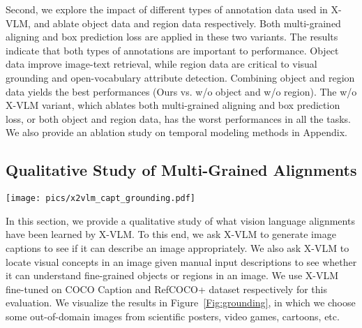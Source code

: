 \documentclass{article}
\newcommand{\baby}{X-VLM\xspace}
\newcommand{\babyL}{X-VLM\xspace}
\begin{document}
Second, we explore the impact of different types of annotation data used in \baby, and ablate object data and region data respectively. Both multi-grained aligning and box prediction loss are applied in these two variants. The results indicate that both types of annotations are important to performance. Object data improve image-text retrieval, while region data are critical to visual grounding and open-vocabulary attribute detection. Combining object and region data yields the best performances (Ours vs. w/o object and w/o region). The w/o \baby variant, which ablates both multi-grained aligning and box prediction loss, or both object and region data, has the worst performances in all the tasks. We also provide an ablation study on temporal modeling methods in Appendix. 





\subsection{Qualitative Study of Multi-Grained Alignments}

\begin{figure*}[t]
\begin{center}
\centerline{\texttt{[image: pics/x2vlm\_capt\_grounding.pdf]}}
\caption{\textbf{Visualization of \baby generating image captions and locating visual concepts given manual input texts.} Only the image in the upper left corner is from the COCO dataset. Others are out-of-domain images from the internet. We give more examples in Appendix where we test \baby on images from robot grasping, e-commerce websites, and children's textbooks. }
\label{Fig:grounding}
\end{center}
\end{figure*}

In this section, we provide a qualitative study of what vision language alignments have been learned by \baby. To this end, we ask \baby to generate image captions to see if it can describe an image appropriately. We also ask \baby to locate visual concepts in an image given manual input descriptions to see whether it can understand fine-grained objects or regions in an image. We use \babyL fine-tuned on COCO Caption and RefCOCO+ dataset respectively for this evaluation. We visualize the results in Figure~\ref{Fig:grounding}, in which we choose some out-of-domain images from scientific posters, video games, cartoons, etc. 
\end{document}
